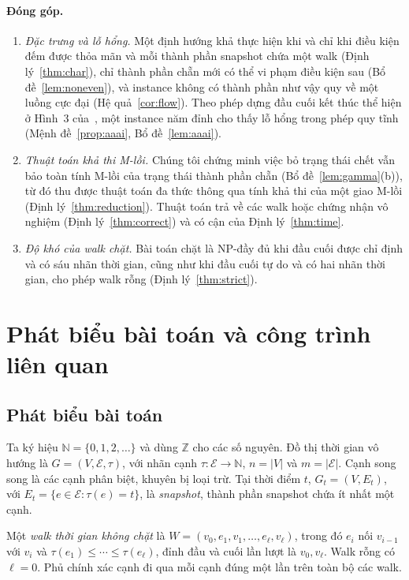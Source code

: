 \documentclass[pdflatex,sn-mathphys-num]{sn-jnl}
\theoremstyle{thmstyleone}
\theoremstyle{thmstyletwo}
\theoremstyle{thmstylethree}
\newcommand{\N}{\mathbb{N}}
\newcommand{\Z}{\mathbb{Z}}
\newcommand{\cE}{\mathcal{E}}
\newcommand{\abs}[1]{\lvert #1\rvert}
\begin{document}
\paragraph{Đóng góp.}
\begin{enumerate}
\item \emph{Đặc trưng và lỗ hổng.} Một định hướng khả thực hiện khi và chỉ khi điều kiện đếm được thỏa mãn và mỗi thành phần snapshot chứa một walk (Định lý~\ref{thm:char}), chỉ thành phần chẵn mới có thể vi phạm điều kiện sau (Bổ đề~\ref{lem:noneven}), và instance không có thành phần như vậy quy về một luồng cực đại (Hệ quả~\ref{cor:flow}). Theo phép dựng đầu cuối kết thúc thể hiện ở Hình~3 của~\cite{deligkas2025}, một instance năm đỉnh cho thấy lỗ hổng trong phép quy tĩnh (Mệnh đề~\ref{prop:aaai}, Bổ đề~\ref{lem:aaai}).
\item \emph{Thuật toán khả thi M-lồi.} Chúng tôi chứng minh việc bỏ trạng thái chết vẫn bảo toàn tính M-lồi của trạng thái thành phần chẵn (Bổ đề~\ref{lem:gamma}(b)), từ đó thu được thuật toán đa thức thông qua tính khả thi của một giao M-lồi (Định lý~\ref{thm:reduction}). Thuật toán trả về các walk hoặc chứng nhận vô nghiệm (Định lý~\ref{thm:correct}) và có cận của Định lý~\ref{thm:time}.
\item \emph{Độ khó của walk chặt.} Bài toán chặt là NP-đầy đủ khi đầu cuối được chỉ định và có sáu nhãn thời gian, cũng như khi đầu cuối tự do và có hai nhãn thời gian, cho phép walk rỗng (Định lý~\ref{thm:strict}).
\end{enumerate}

\section{Phát biểu bài toán và công trình liên quan}\label{sec:prelim}

\subsection{Phát biểu bài toán}\label{sec:problem}

Ta ký hiệu $\N=\{0,1,2,\ldots\}$ và dùng $\Z$ cho các số nguyên. Đồ thị thời gian vô hướng là $G=(V,\cE,\tau)$, với nhãn cạnh $\tau:\cE\to\N$, $n=\abs{V}$ và $m=\abs{\cE}$. Cạnh song song là các cạnh phân biệt, khuyên bị loại trừ. Tại thời điểm $t$, $G_t=(V,E_t)$, với $E_t=\{e\in\cE:\tau(e)=t\}$, là \emph{snapshot}, thành phần snapshot chứa ít nhất một cạnh.

Một \emph{walk thời gian không chặt} là $W=(v_0,e_1,v_1,\ldots,e_\ell,v_\ell)$, trong đó $e_i$ nối $v_{i-1}$ với $v_i$ và $\tau(e_1)\le\cdots\le\tau(e_\ell)$, đỉnh đầu và cuối lần lượt là $v_0,v_\ell$. Walk rỗng có $\ell=0$. Phủ chính xác cạnh đi qua mỗi cạnh đúng một lần trên toàn bộ các walk.
\end{document}
